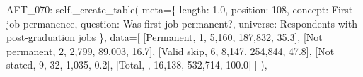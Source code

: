 \documentclass[
  11pt,
  a4paper,
]{article}
\newenvironment{Shaded}{\begin{snugshade}}{\end{snugshade}}
\newcommand{\NormalTok}[1]{\textcolor[rgb]{0.00,0.23,0.31}{#1}}
\newcommand{\OperatorTok}[1]{\textcolor[rgb]{0.37,0.37,0.37}{#1}}
\newcommand{\StringTok}[1]{\textcolor[rgb]{0.13,0.47,0.30}{#1}}
\newcommand{\VariableTok}[1]{\textcolor[rgb]{0.07,0.07,0.07}{#1}}
\begin{document}
\begin{Shaded}
\begin{Highlighting}[]
            \StringTok{\textquotesingle{}AFT\_070\textquotesingle{}}\NormalTok{: }\VariableTok{self}\NormalTok{.\_create\_table(}
\NormalTok{                meta}\OperatorTok{=}\NormalTok{\{}
                    \StringTok{\textquotesingle{}length\textquotesingle{}}\NormalTok{: }\StringTok{\textquotesingle{}1.0\textquotesingle{}}\NormalTok{, }\StringTok{\textquotesingle{}position\textquotesingle{}}\NormalTok{: }\StringTok{\textquotesingle{}108\textquotesingle{}}\NormalTok{,}
                    \StringTok{\textquotesingle{}concept\textquotesingle{}}\NormalTok{: }\StringTok{\textquotesingle{}First job permanence\textquotesingle{}}\NormalTok{,}
                    \StringTok{\textquotesingle{}question\textquotesingle{}}\NormalTok{: }\StringTok{\textquotesingle{}Was first job permanent?\textquotesingle{}}\NormalTok{,}
                    \StringTok{\textquotesingle{}universe\textquotesingle{}}\NormalTok{: }\StringTok{\textquotesingle{}Respondents with post{-}graduation jobs\textquotesingle{}}
\NormalTok{                \},}
\NormalTok{                data}\OperatorTok{=}\NormalTok{[}
\NormalTok{                    [}\StringTok{\textquotesingle{}Permanent\textquotesingle{}}\NormalTok{, }\StringTok{\textquotesingle{}1\textquotesingle{}}\NormalTok{, }\StringTok{\textquotesingle{}5,160\textquotesingle{}}\NormalTok{, }\StringTok{\textquotesingle{}187,832\textquotesingle{}}\NormalTok{, }\StringTok{\textquotesingle{}35.3\textquotesingle{}}\NormalTok{],}
\NormalTok{                    [}\StringTok{\textquotesingle{}Not permanent\textquotesingle{}}\NormalTok{, }\StringTok{\textquotesingle{}2\textquotesingle{}}\NormalTok{, }\StringTok{\textquotesingle{}2,799\textquotesingle{}}\NormalTok{, }\StringTok{\textquotesingle{}89,003\textquotesingle{}}\NormalTok{, }\StringTok{\textquotesingle{}16.7\textquotesingle{}}\NormalTok{],}
\NormalTok{                    [}\StringTok{\textquotesingle{}Valid skip\textquotesingle{}}\NormalTok{, }\StringTok{\textquotesingle{}6\textquotesingle{}}\NormalTok{, }\StringTok{\textquotesingle{}8,147\textquotesingle{}}\NormalTok{, }\StringTok{\textquotesingle{}254,844\textquotesingle{}}\NormalTok{, }\StringTok{\textquotesingle{}47.8\textquotesingle{}}\NormalTok{],}
\NormalTok{                    [}\StringTok{\textquotesingle{}Not stated\textquotesingle{}}\NormalTok{, }\StringTok{\textquotesingle{}9\textquotesingle{}}\NormalTok{, }\StringTok{\textquotesingle{}32\textquotesingle{}}\NormalTok{, }\StringTok{\textquotesingle{}1,035\textquotesingle{}}\NormalTok{, }\StringTok{\textquotesingle{}0.2\textquotesingle{}}\NormalTok{],}
\NormalTok{                    [}\StringTok{\textquotesingle{}Total\textquotesingle{}}\NormalTok{, }\StringTok{\textquotesingle{}\textquotesingle{}}\NormalTok{, }\StringTok{\textquotesingle{}16,138\textquotesingle{}}\NormalTok{, }\StringTok{\textquotesingle{}532,714\textquotesingle{}}\NormalTok{, }\StringTok{\textquotesingle{}100.0\textquotesingle{}}\NormalTok{]}
\NormalTok{                ]}
\NormalTok{            ),}
            

\end{Highlighting}
\end{Shaded}
\end{document}
